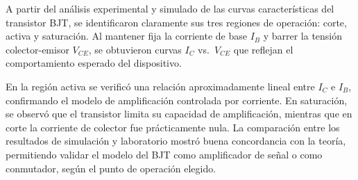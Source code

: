     A partir del análisis experimental y simulado de las curvas características del transistor BJT, se identificaron claramente sus tres regiones de operación: corte, activa y saturación. Al mantener fija la corriente de base $I_B$ y barrer la tensión colector-emisor $V_{CE}$, se obtuvieron curvas $I_C$ vs.\ $V_{CE}$ que reflejan el comportamiento esperado del dispositivo.
    
    En la región activa se verificó una relación aproximadamente lineal entre $I_C$ e $I_B$, confirmando el modelo de amplificación controlada por corriente. En saturación, se observó que el transistor limita su capacidad de amplificación, mientras que en corte la corriente de colector fue prácticamente nula. La comparación entre los resultados de simulación y laboratorio mostró buena concordancia con la teoría, permitiendo validar el modelo del BJT como amplificador de señal o como conmutador, según el punto de operación elegido.

